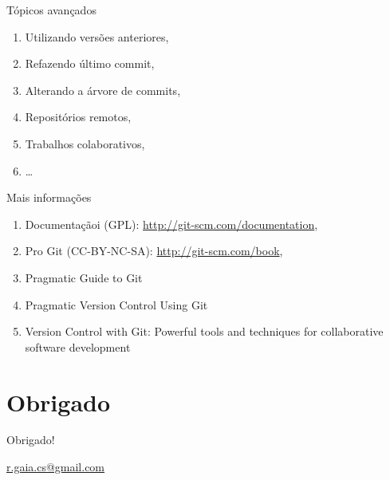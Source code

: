 \documentclass[11pt]{beamer}
\begin{document}
\begin{frame}{Tópicos avançados}
    \begin{enumerate}
        \item Utilizando versões anteriores, \pause
        \item Refazendo último commit, \pause
        \item Alterando a árvore de commits, \pause
        \item Repositórios remotos, \pause
        \item Trabalhos colaborativos,
        \item \ldots
    \end{enumerate}
\end{frame}

\begin{frame}{Mais informações}
    \begin{enumerate}
        \item Documentaçãoi (GPL): \url{http://git-scm.com/documentation},
        \item Pro Git (CC-BY-NC-SA): \url{http://git-scm.com/book},
        \item Pragmatic Guide to Git
        \item Pragmatic Version Control Using Git
        \item Version Control with Git: Powerful tools and techniques for
            collaborative software development
    \end{enumerate}
\end{frame}

\section*{Obrigado}
\begin{frame}
    \begin{center}
        Obrigado!
    \end{center}
    \begin{center}
        \url{r.gaia.cs@gmail.com}
    \end{center}
\end{frame}
\end{document}
